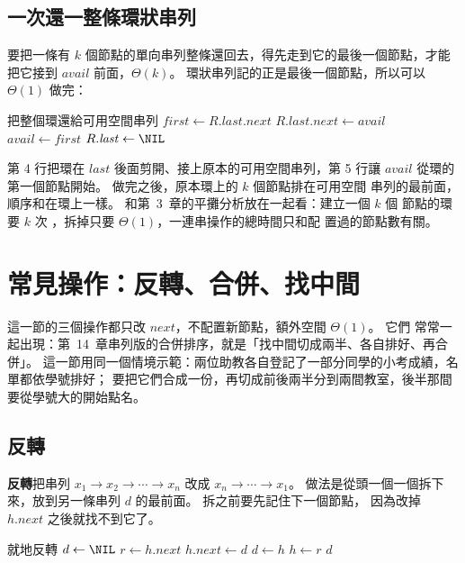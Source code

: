 \subsection{一次還一整條環狀串列}

要把一條有 $k$ 個節點的單向串列整條還回去，得先走到它的最後一個節點，才能把它接到
$\mathit{avail}$ 前面，$\Theta(k)$。 環狀串列記的正是最後一個節點，所以可以
$\Theta(1)$ 做完：

\enlargethispage{\baselineskip}%
\begin{pseudo}[label=alg:ll-ring-erase]{把整個環還給可用空間串列}
        \State $\mathit{first} \gets R.\mathit{last}.\mathit{next}$
        \State $R.\mathit{last}.\mathit{next} \gets \mathit{avail}$
        \State $\mathit{avail} \gets \mathit{first}$
        \State $R.\mathit{last} \gets \NIL$
    \EndIf
\EndProcedure
\end{pseudo}

第 4 行把環在 $\mathit{last}$ 後面剪開、接上原本的可用空間串列，第 5 行讓
$\mathit{avail}$ 從環的第一個節點開始。 做完之後，原本環上的 $k$ 個節點排在可用空間
串列的最前面，順序和在環上一樣。 和第~3~章的平攤分析放在一起看：建立一個 $k$ 個
節點的環要 $k$ 次 ，拆掉只要 $\Theta(1)$，一連串操作的總時間只和配
置過的節點數有關。

\section{常見操作：反轉、合併、找中間}
\label{sec:ll-ops}

這一節的三個操作都只改 $\mathit{next}$，不配置新節點，額外空間 $\Theta(1)$。 它們
常常一起出現：第~14~章串列版的合併排序，就是「找中間切成兩半、各自排好、再合併」。
這一節用同一個情境示範：兩位助教各自登記了一部分同學的小考成績，名單都依學號排好；
要把它們合成一份，再切成前後兩半分到兩間教室，後半那間要從學號大的開始點名。

\subsection{反轉}

\textbf{反轉}把串列 $x_1 \to x_2 \to \cdots \to x_n$ 改成 $x_n \to \cdots \to x_1$。
做法是從頭一個一個拆下來，放到另一條串列 $d$ 的最前面。 拆之前要先記住下一個節點，
因為改掉 $h.\mathit{next}$ 之後就找不到它了。

\begin{pseudo}[label=alg:ll-reverse, unbreakable]{就地反轉}
 
    \State $d \gets \NIL$ 
        \State $r \gets h.\mathit{next}$ 
        \State $h.\mathit{next} \gets d$
        \State $d \gets h$
        \State $h \gets r$
    \EndWhile
    \State \Return $d$
\EndFunction
\end{pseudo}

